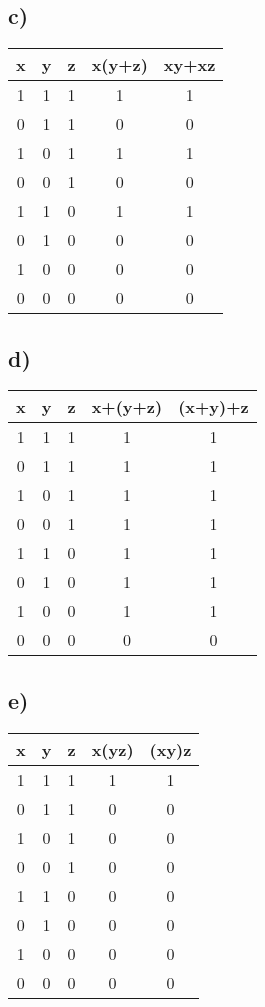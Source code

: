 \documentclass{article}
\begin{document}
\subsection*{c)}
\begin{center}
    \begin{tabular}{|c|c|c|c|c|}
        \hline
        x&y&z&x(y+z)&xy+xz\\
        \hline
        1&1&1&1&1\\
        0&1&1&0&0\\
        1&0&1&1&1\\
        0&0&1&0&0\\
        1&1&0&1&1\\
        0&1&0&0&0\\
        1&0&0&0&0\\
        0&0&0&0&0\\
        \hline
    \end{tabular}
\end{center}

\subsection*{d)}
\begin{center}
    \begin{tabular}{|c|c|c|c|c|}
        \hline
        x&y&z&x+(y+z)&(x+y)+z\\
        \hline
        1&1&1&1&1\\
        0&1&1&1&1\\
        1&0&1&1&1\\
        0&0&1&1&1\\
        1&1&0&1&1\\
        0&1&0&1&1\\
        1&0&0&1&1\\
        0&0&0&0&0\\
        \hline
    \end{tabular}
\end{center}

\subsection*{e)}
\begin{center}
    \begin{tabular}{|c|c|c|c|c|}
        \hline
        x&y&z&x(yz)&(xy)z\\
        \hline
        1&1&1&1&1\\
        0&1&1&0&0\\
        1&0&1&0&0\\
        0&0&1&0&0\\
        1&1&0&0&0\\
        0&1&0&0&0\\
        1&0&0&0&0\\
        0&0&0&0&0\\
        \hline
    \end{tabular}
\end{center}
\end{document}
